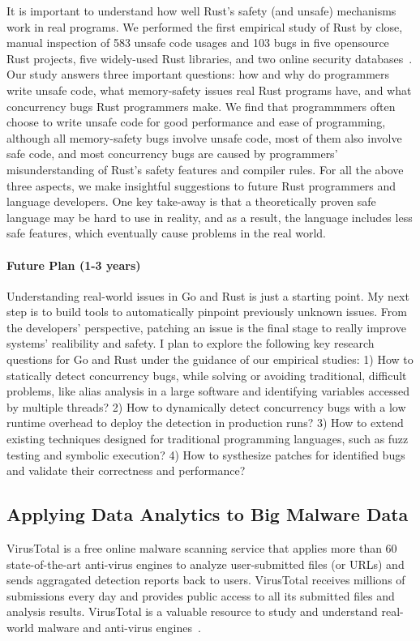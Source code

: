 \documentclass[10pt]{article}
\begin{document}
It is important to understand how well Rust’s safety (and
unsafe) mechanisms work in real programs. We performed
the first empirical study of Rust by close, manual inspection of 583 unsafe code usages 
and 103 bugs in five opensource Rust projects, five widely-used Rust libraries, and two
online security databases~\cite{sosp-boqin,yu2019fearless}. Our study answers three important 
questions: how and why do programmers write unsafe
code, what memory-safety issues real Rust programs have,
and what concurrency bugs Rust programmers make. 
We find that programmmers often choose to write unsafe code for good performance 
and ease of programming, although all memory-safety bugs involve unsafe code, 
most of them also involve safe code, and 
most concurrency bugs are caused by programmers' misunderstanding of Rust's safety features 
and compiler rules. 
For all the above three aspects, we make insightful suggestions 
to future Rust programmers and language developers. 
One key take-away is that a theoretically proven safe language may be hard to 
use in reality, and as a result, the language includes less safe features, which eventually cause
problems in the real world.

\vspace{-.1in}
\paragraph{Future Plan (1-3 years)}
Understanding real-world issues in Go and Rust is just a starting point.
My next step is to build tools to automatically pinpoint previously unknown issues. 
From the developers' perspective, patching an issue is the final 
stage to really improve systems' realibility and safety. 
I plan to explore the following key research questions for Go and Rust 
under the guidance of our empirical studies: 
1) How to statically detect concurrency bugs, 
while solving or avoiding traditional, difficult problems, 
like alias analysis in a large software
and identifying variables accessed by multiple threads?
2) How to dynamically detect concurrency bugs with a low 
runtime overhead to deploy the detection in production runs?
3) How to extend existing techniques designed for traditional programming languages, 
such as fuzz testing and symbolic execution?
4) How to systhesize patches for identified bugs and validate 
their correctness and performance?

\vspace{-.1in}
\subsection{Applying Data Analytics to Big Malware Data}
VirusTotal is a free online malware scanning service that applies 
more than 60 state-of-the-art anti-virus engines to analyze user-submitted files (or URLs)
and sends aggragated detection reports back to users. 
VirusTotal receives millions of submissions every day and 
provides public access to all 
its submitted files and analysis results.
VirusTotal is a valuable resource to study and understand real-world malware 
and anti-virus engines~\cite{Song16ApSys}.  
\end{document}
